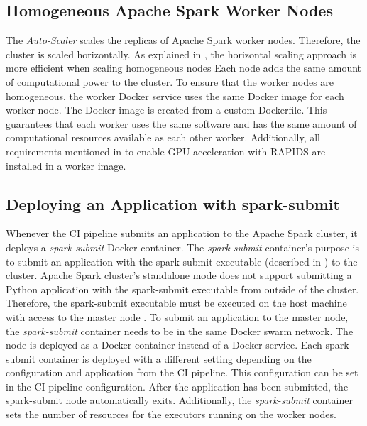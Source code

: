 \subsection{Homogeneous Apache Spark Worker Nodes}
The \textit{Auto-Scaler} scales the replicas of Apache Spark worker nodes. Therefore, the cluster is scaled horizontally. As explained in , the horizontal scaling approach is more efficient when scaling homogeneous nodes Each node adds the same amount of computational power to the cluster.
To ensure that the worker nodes are homogeneous, the worker Docker service uses the same Docker image for each worker node. The Docker image is created from a custom Dockerfile.
This guarantees that each worker uses the same software and has the same amount of computational resources available as each other worker.
Additionally, all requirements mentioned in  to enable GPU acceleration with RAPIDS are installed in a worker image.


\subsection{Deploying an Application with spark-submit}
\label{subsec:05_spark_spark-submit}
Whenever the CI pipeline submits an application to the Apache Spark cluster, it deploys a \textit{spark-submit} Docker container.
The \textit{spark-submit} container's purpose is to submit an application with the spark-submit executable (described in ) to the cluster.
Apache Spark cluster's standalone mode does not support submitting a Python application with the spark-submit executable from outside of the cluster. Therefore, the spark-submit executable must be executed on the host machine with access to the master node \cite{Apache2020Spark}.
To submit an application to the master node, the \textit{spark-submit} container needs to be in the same Docker swarm network. The node is deployed as a Docker container instead of a Docker service. Each spark-submit container is deployed with a different setting depending on the configuration and application from the CI pipeline. This configuration can be set in the CI pipeline configuration.
After the application has been submitted, the spark-submit node automatically exits.
Additionally, the \textit{spark-submit} container sets the number of resources for the executors running on the worker nodes.


